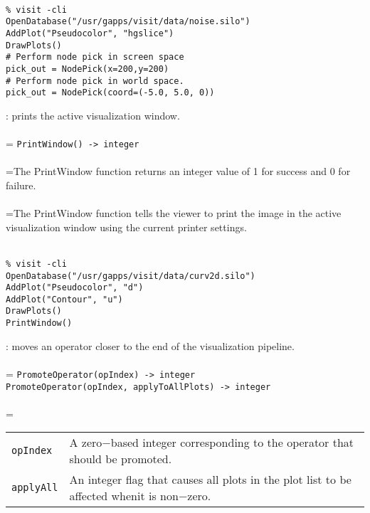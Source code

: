 \documentclass[10pt,a4paper]{report}
\begin{document}
\\[-6mm]
\begin{verbatim}% visit -cli
OpenDatabase("/usr/gapps/visit/data/noise.silo")
AddPlot("Pseudocolor", "hgslice")
DrawPlots()
# Perform node pick in screen space
pick_out = NodePick(x=200,y=200)
# Perform node pick in world space.
pick_out = NodePick(coord=(-5.0, 5.0, 0))
\end{verbatim}
\newpage


{}
: prints the active visualization window.\\[-3mm]

 \\ 
\hangindent=\parindent 
\verb!PrintWindow() -> integer!\\ [-3mm]

 \\ 
\hangindent=\parindent The PrintWindow function returns an integer value of 1 for success and 0 for failure. \\[-3mm] 

 \\ 
\hangindent=\parindent The PrintWindow function tells the viewer to print the image in the active visualization window using the current printer settings. \\[-3mm] 

\\[-6mm]
\begin{verbatim}% visit -cli
OpenDatabase("/usr/gapps/visit/data/curv2d.silo")
AddPlot("Pseudocolor", "d")
AddPlot("Contour", "u")
DrawPlots()
PrintWindow()
\end{verbatim}
\newpage


{}
: moves an operator closer to the end of the visualization pipeline.\\[-3mm]

 \\ 
\hangindent=\parindent 
\verb!PromoteOperator(opIndex) -> integer!\\ 
\verb!PromoteOperator(opIndex, applyToAllPlots) -> integer!\\ [-3mm]

 \\ 
\hangindent=\parindent 
\begin{tabular}{lp{9cm}}
\verb!opIndex! & A zero$-$based integer corresponding to the operator that should be promoted. \\
\verb!applyAll! & An integer flag that causes all plots in the plot list to be affected whenit is non$-$zero. \\
\end{tabular} \\[-2mm]
\end{document}

